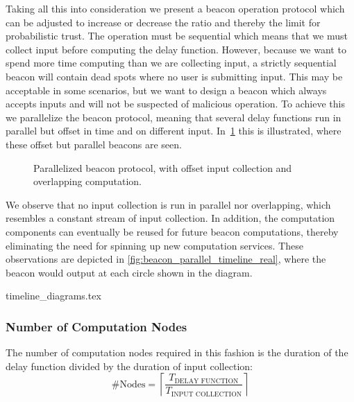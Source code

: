 Taking all this into consideration we present a beacon operation protocol which can be adjusted to increase or decrease the ratio and thereby the limit for probabilistic trust.
The operation must be sequential which means that we must collect input before computing the delay function.
However, because we want to spend more time computing than we are collecting input, a strictly sequential beacon will contain dead spots where no user is submitting input.
This may be acceptable in some scenarios, but we want to design a beacon which always accepts inputs and will not be suspected of malicious operation.
To achieve this we parallelize the beacon protocol, meaning that several delay functions run in parallel but offset in time and on different input.
In~\cref{fig:beacon_parallel_timeline} this is illustrated, where these offset but parallel beacons are seen.
\begin{figure}[htb]
    \centering
    \footnotesize
    \caption{Parallelized beacon protocol, with offset input collection and overlapping computation.}\label{fig:beacon_parallel_timeline}
\end{figure}

We observe that no input collection is run in parallel nor overlapping, which resembles a constant stream of input collection.
In addition, the computation components can eventually be reused for future beacon computations, thereby eliminating the need for spinning up new computation services.
These observations are depicted in \cref{fig:beacon_parallel_timeline_real}, where the beacon would output at each circle shown in the diagram.

{timeline_diagrams.tex}

\subsubsection{Number of Computation Nodes}
The number of computation nodes required in this fashion is the duration of the delay function divided by the duration of input collection:
\begin{equation*}
    \#\text{Nodes} = \left\lceil\frac{T_\text{DELAY FUNCTION}}{T_\text{INPUT COLLECTION}}\right\rceil
\end{equation*}

